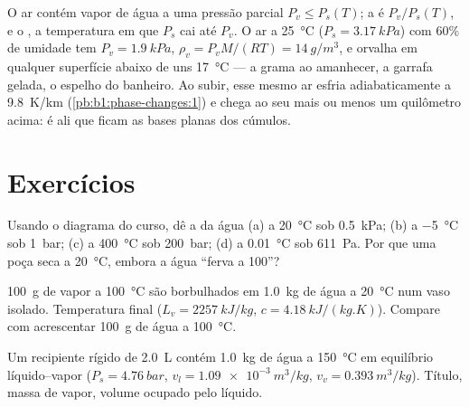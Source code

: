 \begin{example}\label{ex:b1:phase-changes:dew}
O ar contém vapor de água a uma pressão parcial $P_v \leq P_s(T)$; a
\emph{} é $P_v/P_s(T)$, e o \emph{}, a
temperatura em que $P_s$ cai até $P_v$. O ar a \qty{25}{\degreeCelsius}
($P_s = \qty{3.17}{kPa}$) com $60\%$ de umidade tem $P_v = \qty{1.9}{kPa}$,
$\rho_v = P_vM/(RT) = \qty{14}{g/m^3}$, e orvalha em qualquer superfície abaixo
de uns \qty{17}{\degreeCelsius} --- a grama ao amanhecer, a garrafa gelada, o
espelho do banheiro. Ao subir, esse mesmo ar esfria adiabaticamente a
\qty{9.8}{K/km} (\cref{pb:b1:phase-changes:1}) e chega ao seu 
mais ou menos um quilômetro acima: é ali que ficam as bases planas dos cúmulos.
\end{example}

\section{Exercícios}

\begin{exercise}[$\star$]\label{exo:b1:phase-changes:1}
Usando o diagrama do curso, dê a  da água (a) a
\qty{20}{\degreeCelsius} sob \qty{0.5}{kPa}; (b) a \qty{-5}{\degreeCelsius}
sob \qty{1}{bar}; (c) a \qty{400}{\degreeCelsius} sob \qty{200}{bar};
(d) a \qty{0.01}{\degreeCelsius} sob \qty{611}{Pa}. Por que uma poça seca
a \qty{20}{\degreeCelsius}, embora a água ``ferva a 100''?
\end{exercise}

\begin{exercise}[$\star$]\label{exo:b1:phase-changes:2}
\qty{100}{g} de vapor a \qty{100}{\degreeCelsius} são borbulhados em
\qty{1.0}{kg} de água a \qty{20}{\degreeCelsius} num vaso isolado.
Temperatura final ($L_v = \qty{2257}{kJ/kg}$, $c = \qty{4.18}{kJ/(kg.K)}$).
Compare com acrescentar \qty{100}{g} de água a \qty{100}{\degreeCelsius}.
\end{exercise}

\begin{exercise}[$\star$]\label{exo:b1:phase-changes:3}
Um recipiente rígido de \qty{2.0}{L} contém \qty{1.0}{kg} de água a
\qty{150}{\degreeCelsius} em equilíbrio líquido--vapor ($P_s =
\qty{4.76}{bar}$, $v_l = \qty{1.09e-3}{m^3/kg}$, $v_v = \qty{0.393}{m^3/kg}$).
Título, massa de vapor, volume ocupado pelo líquido.
\end{exercise}

